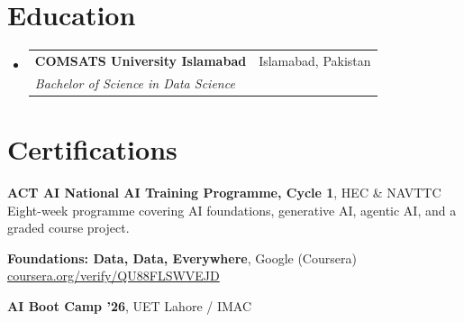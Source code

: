 \documentclass[a4paper,11pt]{article}
\makeatletter
\newcommand{\resumeSubheading}[4]{
  \vspace{-1pt}\item
    \begin{tabular*}{0.97\textwidth}[t]{l@{\extracolsep{\fill}}r}
      \textbf{#1} & #2 \\
      \textit{\small#3} & \textit{\small #4} \\
    \end{tabular*}\vspace{-6pt}
}
\newcommand{\resumeSubHeadingListStart}{\begin{itemize}[leftmargin=0.12in, label={}]}
\newcommand{\resumeSubHeadingListEnd}{\end{itemize}}
\makeatother
\begin{document}
\section{Education}
  \resumeSubHeadingListStart
    \resumeSubheading
      {COMSATS University Islamabad}{Islamabad, Pakistan}
      {Bachelor of Science in Data Science}{}
  \resumeSubHeadingListEnd

\section{Certifications}
 \begin{itemize}[leftmargin=0.12in, label={}, itemsep=2pt]
    \small{\item{
     \textbf{ACT AI National AI Training Programme, Cycle 1}, HEC \& NAVTTC \\
     Eight-week programme covering AI foundations, generative AI, agentic AI, and a graded course project.
    }}
    \small{\item{
     \textbf{Foundations: Data, Data, Everywhere}, Google (Coursera) \\
     \href{https://www.coursera.org/verify/QU88FLSWVEJD}{coursera.org/verify/QU88FLSWVEJD}
    }}
    \small{\item{
     \textbf{AI Boot Camp '26}, UET Lahore / IMAC
    }}
 \end{itemize}
\end{document}
